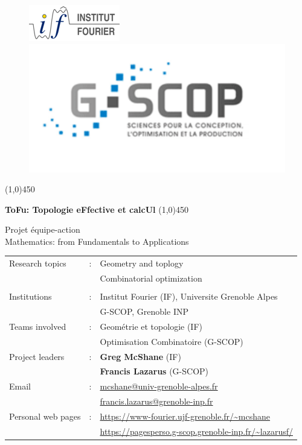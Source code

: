 \documentclass[14pt,fleqn]{article}
\begin{document}
 \begin{figure}[H]
  \centering
  \subfloat  
{\includegraphics[scale=1]{iflogo-azur-sable-150x60_0.png}  
}
 \hfill
  \subfloat
  {\includegraphics[scale=.4]{gscop.png}  
}

\end{figure}


\begin{center}
\line(1,0){450}

\vspace{0.2in}
{\huge \bf ToFu: Topologie eFfective et calcUl}
\vspace{0.2in}
\line(1,0){450}
\bigskip

{\Large Projet équipe-action  \\
Mathematics: from Fundamentals to Applications}
\\
\end{center}




 


\begin{center}
\begin{tabular}[h]{lcl}
Research topics &:& Geometry and toplogy\\
&& Combinatorial optimization \\
&& \\
Institutions &:& Institut Fourier (IF), Universite Grenoble Alpes \\
&& G-SCOP, Grenoble INP\\
Teams involved
&:& Geométrie et topologie (IF) \\
&& Optimisation Combinatoire (G-SCOP)\\
Project leaders
&:& {\bf Greg McShane} (IF) \\
&& {\bf Francis Lazarus} (G-SCOP) \\
Email
&:& \url{mcshane@univ-grenoble-alpes.fr}  \\
&&  \url{francis.lazarus@grenoble-inp.fr}\\
Personal web pages
&:& \url{https://www-fourier.ujf-grenoble.fr/~mcshane}\\
&& \url{https://pagesperso.g-scop.grenoble-inp.fr/~lazarusf/}\\


\end{tabular}
\end{center}
\end{document}
